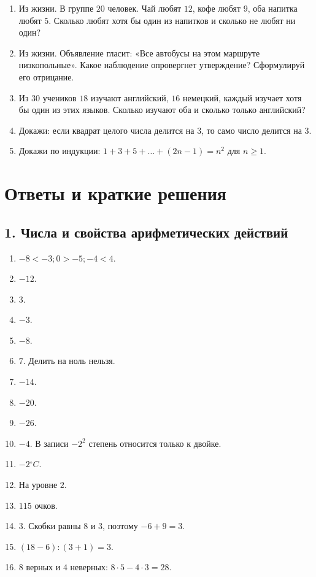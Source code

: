 \documentclass[12pt,a4paper]{article}
\theoremstyle{definition}
\theoremstyle{plain}
\theoremstyle{remark}
\newcommand{\starmark}{\ensuremath{{}^{\ast}}}
\begin{document}
\begin{enumerate}[label=\thesection.\arabic*.,leftmargin=2.8em,itemsep=12pt]
\item Из жизни. В группе \(20\) человек. Чай любят \(12\), кофе любят \(9\), оба напитка любят \(5\). Сколько любят хотя бы один из напитков и сколько не любят ни один?
\item Из жизни. Объявление гласит: «Все автобусы на этом маршруте низкопольные». Какое наблюдение опровергнет утверждение? Сформулируй его отрицание.
\item[\textbf{14.16.}\starmark] Из \(30\) учеников \(18\) изучают английский, \(16\) немецкий, каждый изучает хотя бы один из этих языков. Сколько изучают оба и сколько только английский?
\item[\textbf{14.17.}\starmark] Докажи: если квадрат целого числа делится на \(3\), то само число делится на \(3\).
\item[\textbf{14.18.}\starmark] Докажи по индукции: \(1 + 3 + 5 + \ldots  + (2 n - 1) = n^{2}\) для \(n \ge  1\).
\end{enumerate}
\clearpage\section*{Ответы и краткие решения}
\subsection*{1. Числа и свойства арифметических действий}
\begin{enumerate}[label=1.\arabic*.,leftmargin=2.8em,itemsep=5pt]
\item \(- 8 < - 3;\allowbreak 0 > - 5;\allowbreak - 4 < 4\).
\item \(- 12\).
\item \(3\).
\item \(- 3\).
\item \(- 8\).
\item \(7\). Делить на ноль нельзя.
\item \(- 14\).
\item \(- 20\).
\item \(- 26\).
\item \(- 4\). В записи \(- 2^{2}\) степень относится только к двойке.
\item \(- 2 {}^{\circ} C\).
\item На уровне \(2\).
\item \(115\) очков.
\item[\textbf{1.14.}\starmark] \(3\). Скобки равны \(8\) и \(3\), поэтому \(- 6 + 9 = 3\).
\item[\textbf{1.15.}\starmark] \((18 - 6) : (3 + 1) = 3\).
\item[\textbf{1.16.}\starmark] \(8\) верных и \(4\) неверных: \(8 \cdot  5 - 4 \cdot  3 = 28\).
\end{enumerate}
\end{document}

